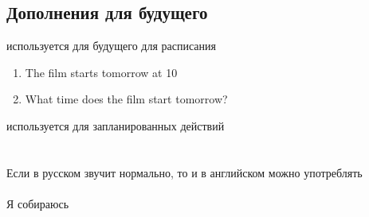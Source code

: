 \subsection{Дополнения для будущего}
\p
{} используется для будущего для расписания
\begin{enumerate}
    \item The film starts tomorrow at 10
    \item What time does the film start tomorrow?
\end{enumerate}
 используется для запланированных действий\\
\\
\\
Если в русском звучит нормально, то и в английском можно употреблять\\\\
Я собираюсь\\
\\
